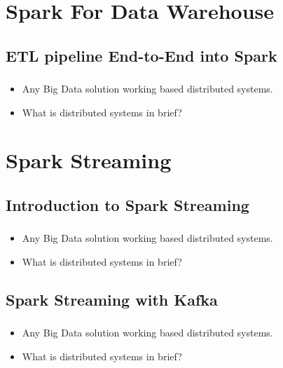 \section{Spark For Data Warehouse}
\subsection{ETL pipeline End-to-End into Spark}

\begin{frame}
  \frametitle{\subsecname}
	\begin{itemize}[<+->]
		\item Any Big Data solution working based distributed systems.
		\item What is distributed systems in brief?
	\end{itemize}
\end{frame}


\section{Spark Streaming}

\subsection{Introduction to Spark Streaming}

\begin{frame}
  \frametitle{\subsecname}
	\begin{itemize}[<+->]
		\item Any Big Data solution working based distributed systems.
		\item What is distributed systems in brief?
	\end{itemize}
\end{frame}


\subsection{Spark Streaming with Kafka}

\begin{frame}
  \frametitle{\subsecname}
	\begin{itemize}[<+->]
		\item Any Big Data solution working based distributed systems.
		\item What is distributed systems in brief?
	\end{itemize}
\end{frame}

